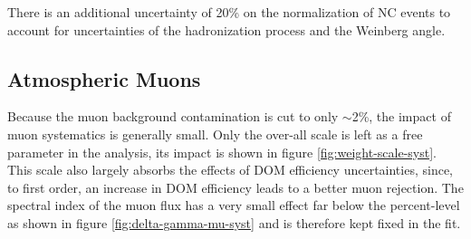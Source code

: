 There is an additional uncertainty of 20\% on the normalization of NC events to account for uncertainties of the hadronization process and the Weinberg angle.

\subsection{Atmospheric Muons}
\label{sec:atm-muons-systematic}
Because the muon background contamination is cut to only $\sim$2\%, the impact of muon systematics is generally small. Only the over-all scale is left as a free parameter in the analysis, its impact is shown in figure \ref{fig:weight-scale-syst}. This scale also largely absorbs the effects of DOM efficiency uncertainties, since, to first order, an increase in DOM efficiency leads to a better muon rejection. The spectral index of the muon flux has a very small effect far below the percent-level as shown in figure \ref{fig:delta-gamma-mu-syst} and is therefore kept fixed in the fit.

